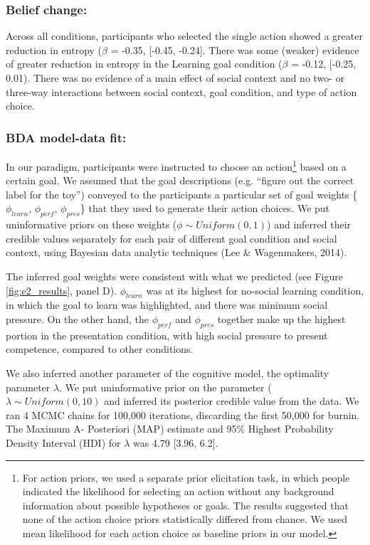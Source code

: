 \documentclass[10pt, letterpaper]{article}
\begin{document}
\subsubsection{Belief change:}\label{belief-change-1}

Across all conditions, participants who selected the single action
showed a greater reduction in entropy (\(\beta\) = -0.35, {[}-0.45,
-0.24{]}. There was some (weaker) evidence of greater reduction in
entropy in the Learning goal condition (\(\beta\) = -0.12, {[}-0.25,
0.01). There was no evidence of a main effect of social context and no
two- or three-way interactions between social context, goal condition,
and type of action choice.

\subsubsection{BDA model-data fit:}\label{bda-model-data-fit}

In our paradigm, participants were instructed to choose an
action\footnote{For action priors, we used a separate prior elicitation task, in which people indicated the likelihood for selecting an action without any background information about possible hypotheses or goals. The results suggested that none of the action choice priors statistically differed from chance. We used mean likelihood for each action choice as baseline priors in our model.}
based on a certain goal. We assumed that the goal descriptions (e.g.
``figure out the correct label for the toy'') conveyed to the
participants a particular set of goal weights \{\(\phi_{learn}\),
\(\phi_{perf}\), \(\phi_{pres}\)\} that they used to generate their
action choices. We put uninformative priors on these weights
(\(\phi \sim Uniform(0,1)\)) and inferred their credible values
separately for each pair of different goal condition and social context,
using Bayesian data analytic techniques (Lee \& Wagenmakers, 2014).

The inferred goal weights were consistent with what we predicted (see
Figure \ref{fig:e2_results}, panel D). \(\phi_{learn}\) was at its
highest for no-social learning condition, in which the goal to learn was
highlighted, and there was minimum social pressure. On the other hand,
the \(\phi_{perf}\) and \(\phi_{pres}\) together make up the highest
portion in the presentation condition, with high social pressure to
present competence, compared to other conditions.

We also inferred another parameter of the cognitive model, the
optimality parameter \(\lambda\). We put uninformative prior on the
parameter (\(\lambda \sim Uniform(0,10)\) and inferred its posterior
credible value from the data. We ran 4 MCMC chains for 100,000
iterations, discarding the first 50,000 for burnin. The Maximum A-
Posteriori (MAP) estimate and 95\% Highest Probability Density Interval
(HDI) for \(\lambda\) was 4.79 {[}3.96, 6.2{]}.
\end{document}
